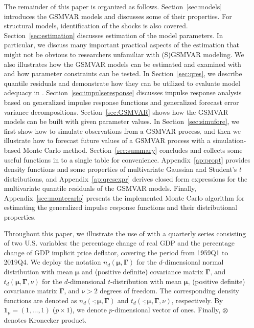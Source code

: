 \documentclass[nojss]{jss}
\begin{document}
The remainder of this paper is organized as follows. Section~\ref{sec:models} introduces the GSMVAR models and discusses some of their properties. For structural models, identification of the shocks is also covered. Section~\ref{sec:estimation} discusses estimation of the model parameters. In particular, we discuss many important practical aspects of the estimation that might not be obvious to researchers unfamiliar with (S)GSMVAR modeling. We also illustrates how the GSMVAR models can be estimated and examined with  and how parameter constraints can be tested.  In Section~\ref{sec:qres}, we describe quantile residuals and demonstrate how they can be utilized to evaluate model adequacy in . Section~\ref{sec:impulseresponse} discusses impulse response analysis based on generalized impulse response functions and generalized forecast error variance decompositions. Section~\ref{sec:GSMVAR} shows how the GSMVAR models can be built with given parameter values. In Section~\ref{sec:simufore}, we first show how to simulate observations from a GSMVAR process, and then we illustrate how to forecast future values of a GSMVAR process with a simulation-based Monte Carlo method. Section~\ref{sec:summary} concludes and collects some useful functions in  to a single table for convenience. Appendix~\ref{ap:propt} provides density functions and some properties of multivariate Gaussian and Student's $t$ distributions, and Appendix~\ref{ap:qresexpr} derives closed form expressions for the multivariate quantile residuals of the GSMVAR models. Finally, Appendix~\ref{sec:montecarlo} presents the implemented Monte Carlo algorithm for estimating the generalized impulse response functions and their distributional properties.

Throughout this paper, we illustrate the use of  with a quarterly series consisting of two U.S. variables: the percentage change of real GDP and the percentage change of GDP implicit price deflator, covering the period from 1959Q1 to 2019Q4. We deploy the notation $n_d(\boldsymbol{\mu},\boldsymbol{\Gamma})$ for the $d$-dimensional normal distribution with mean $\boldsymbol{\mu}$ and (positive definite) covariance matrix $\boldsymbol{\Gamma}$, and $t_d(\boldsymbol{\mu},\boldsymbol{\Gamma},\nu)$ for the $d$-dimensional $t$-distribution with mean $\boldsymbol{\mu}$, (positive definite) covariance matrix $\boldsymbol{\Gamma}$, and $\nu>2$ degrees of freedom. The corresponding density functions are denoted as $n_d(\cdot;\boldsymbol{\mu},\boldsymbol{\Gamma})$ and $t_d(\cdot;\boldsymbol{\mu},\boldsymbol{\Gamma},\nu)$, respectively. By $\boldsymbol{1}_p=(1,...,1)$ ($p \times 1$), we denote $p$-dimensional vector of ones. Finally, $\otimes$ denotes Kronecker product.
\end{document}
